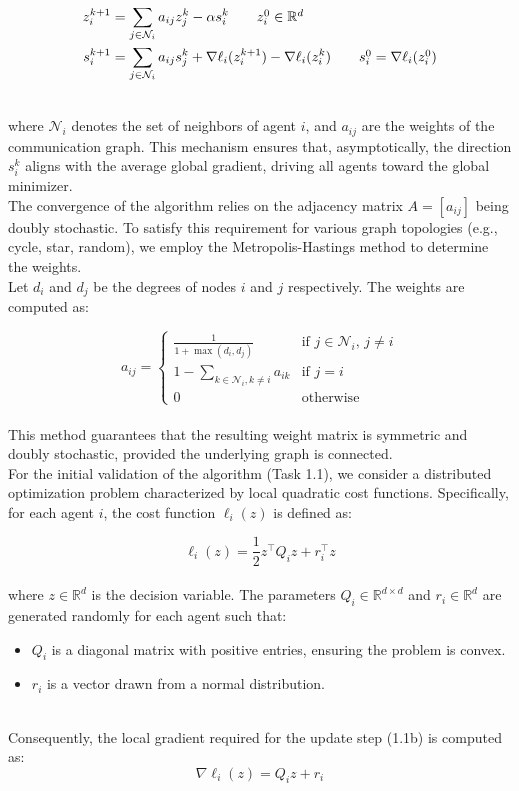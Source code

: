 \documentclass[a4paper,11pt,oneside]{book}
\begin{document}
\begin{align}
    z_{i}^{k+1} &= \sum_{j \in \mathcal{N}_{i}} a_{ij} z_{j}^{k} - \alpha s_{i}^{k} 
    \tag*{$z_i^0 \in \mathbb{R}^{d}$}
    \\
    s_{i}^{k+1} &= \sum_{j \in \mathcal{N}_{i}} a_{ij} s_{j}^{k} + \nabla \ell_{i}(z_{i}^{k+1}) - \nabla \ell_{i}(z_{i}^{k}) 
    \tag*{$s_i^0 = \nabla \ell_i(z_i^0)$}
\end{align}

\\
where $\mathcal{N}_i$ denotes the set of neighbors of agent $i$, and $a_{ij}$ are the weights of the communication graph.
This mechanism ensures that, asymptotically, the direction $s_i^k$ aligns with the average global gradient, driving all agents toward the global minimizer.
\\
The convergence of the algorithm relies on the adjacency matrix $A = [a_{ij}]$ being doubly stochastic. To satisfy this requirement for various graph topologies (e.g., cycle, star, random), we employ the Metropolis-Hastings method to determine the weights. 
\\
Let $d_i$ and $d_j$ be the degrees of nodes $i$ and $j$ respectively. The weights are computed as:

\[
    a_{ij} = 
    \begin{cases} 
        \frac{1}{1 + \max(d_i, d_j)} & \text{if } j \in \mathcal{N}_i, \, j \neq i \\
        1 - \sum_{k \in \mathcal{N}_i, k \neq i} a_{ik} & \text{if } j = i \\
        0 & \text{otherwise}
    \end{cases}
\]
\\
This method guarantees that the resulting weight matrix is symmetric and doubly stochastic, provided the underlying graph is connected.
\\
For the initial validation of the algorithm (Task 1.1), we consider a distributed optimization problem characterized by local quadratic cost functions. Specifically, for each agent $i$, the cost function $\ell_i(z)$ is defined as:

\[
    \ell_i(z) = \frac{1}{2} z^\top Q_i z + r_i^\top z
\]
\\
where $z \in \mathbb{R}^d$ is the decision variable. The parameters $Q_i \in \mathbb{R}^{d \times d}$ and $r_i \in \mathbb{R}^d$ are generated randomly for each agent such that:
\begin{itemize}
    \item $Q_i$ is a diagonal matrix with positive entries, ensuring the problem is convex.
    \item $r_i$ is a vector drawn from a normal distribution.
\end{itemize}
\\
Consequently, the local gradient required for the update step (1.1b) is computed as:
\[
    \nabla \ell_i(z) = Q_i z + r_i
\]
\end{document}
